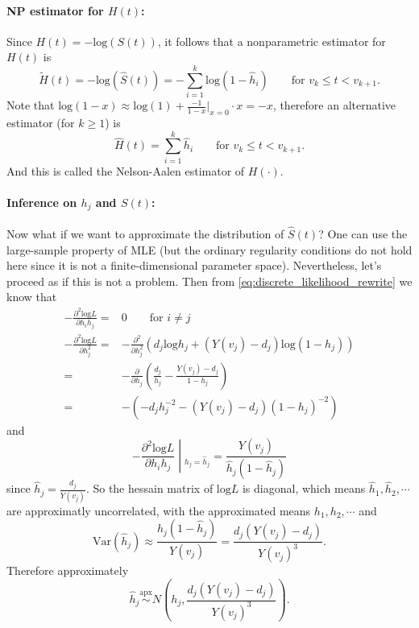 \documentclass[a4paper,12pt]{article}
\begin{document}
\paragraph{NP estimator for $H\left(t\right)$: }

Since $H\left(t\right) = -\mathrm{log}\left(S\left(t\right)\right)$, it follows that a nonparametric estimator for $H\left(t\right)$ is
\[
  \tilde{H}\left(t\right) = -\mathrm{log}\left(\hat{S}\left(t\right)\right) =
  -\sum\limits_{i = 1}^k\mathrm{log}\left(1 - \hat{h}_i\right)
  \quad\quad\text{for } v_k\leq t < v_{k + 1}
  .
\]
Note that $\mathrm{log}\left(1 - x\right) \approx \mathrm{log}\left(1\right) + \frac{-1}{1 - x}|_{x = 0}\cdot x = -x$, therefore an alternative estimator (for $k\geq 1$) is
\[
  \hat{H}\left(t\right) = \sum\limits_{i = 1}^k\hat{h}_i
  \quad\quad\text{for } v_k\leq t < v_{k + 1}
  .  
\]
And this is called the {\color{red}Nelson-Aalen} estimator of $H\left(\cdot\right)$.

\paragraph{Inference on $h_j$ and $S\left(t\right)$: }

Now what if we want to approximate the distribution of $\hat{S}\left(t\right)$? One can use the large-sample property of MLE (but the ordinary regularity conditions do not hold here since it is not a finite-dimensional parameter space). Nevertheless, let's proceed as if this is not a problem. Then from \eqref{eq:discrete_likelihood_rewrite} we know that
\[
  \begin{aligned}
    -\frac{\partial^2\mathrm{log}L}{\partial h_ih_j}
    =& 0
       \quad\quad\text{for } i\neq j    \\
    -\frac{\partial^2\mathrm{log}L}{\partial h_j^2}
    =& - \frac{\partial^2}{\partial h_j^2}\left(
       d_j\mathrm{log}h_j + \left(Y\left(v_j\right) - d_j\right)\mathrm{log}\left(1 - h_j\right)
       \right)    \\
    =& - \frac{\partial}{\partial h_j}\left(
       \frac{d_j}{h_j} - \frac{Y\left(v_j\right) - d_j}{1 - h_j}
       \right)    \\
    =& - \left(
       -d_j h_j^{-2}
       - \left(Y\left(v_j\right) - d_j\right)\left(1 - h_j\right)^{-2}
       \right)
  \end{aligned}
\]
and
\[
  \left.
    -\frac{\partial^2\mathrm{log}L}{\partial h_ih_j}
    \middle|_{h_j = \hat{h}_j}
  \right.
  = \frac{Y\left(v_j\right)}{\hat{h}_j\left(1 - \hat{h}_j\right)}
\]
since $\hat{h}_j = \frac{d_j}{Y\left(v_j\right)}$. So the hessain matrix of $\mathrm{log}L$ is diagonal, which means $\hat{h}_1, \hat{h}_2, \cdots$ are approximatly uncorrelated, with the approximated means $h_1, h_2, \cdots$ and
\[
  \mathrm{Var}\left(\hat{h}_j\right)
  \approx
  \frac{\hat{h}_j\left(1 - \hat{h}_j\right)}{Y\left(v_j\right)}
  = \frac{d_j\left(Y\left(v_j\right) - d_j\right)}{Y\left(v_j\right)^3}
  .
\]
Therefore approximately
\[
  \hat{h}_j \overset{\text{apx}}{\sim} N\left(h_j, \frac{d_j\left(Y\left(v_j\right) - d_j\right)}{Y\left(v_j\right)^3}\right)
  .
\]
\end{document}

